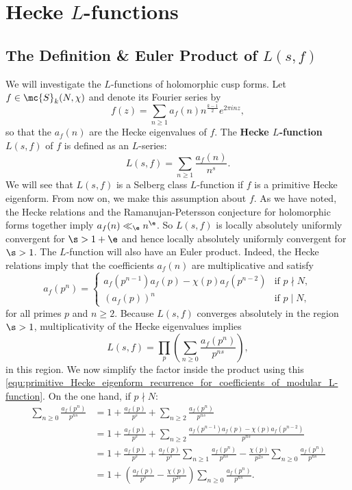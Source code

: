   \section{Hecke \texorpdfstring{$L$}{L}-functions}
    \subsection*{The Definition \& Euler Product of \texorpdfstring{$L(s,f)$}{L(s,f)}}
      We will investigate the $L$-functions of holomorphic cusp forms. Let $f \in \mc{S}_{k}(N,\chi)$ and denote its Fourier series by
      \[
        f(z) = \sum_{n \ge 1}a_{f}(n)n^{\frac{k-1}{2}}e^{2\pi inz},
      \]
      so that the $a_{f}(n)$ are the Hecke eigenvalues of $f$. The \textbf{Hecke $L$-function} $L(s,f)$ of $f$ is defined as an $L$-series:
      \[
        L(s,f) = \sum_{n \ge 1}\frac{a_{f}(n)}{n^{s}}.
      \]
      We will see that $L(s,f)$ is a Selberg class $L$-function if $f$ is a primitive Hecke eigenform. From now on, we make this assumption about $f$. As we have noted, the Hecke relations and the Ramanujan-Petersson conjecture for holomorphic forms together imply $a_{f}(n) \ll_{\e} n^{\e}$. So $L(s,f)$ is locally absolutely uniformly convergent for $\s > 1+\e$ and hence locally absolutely uniformly convergent for $\s > 1$. The $L$-function will also have an Euler product. Indeed, the Hecke relations imply that the coefficients $a_{f}(n)$ are multiplicative and satisfy
      \begin{equation}\label{equ:primitive_Hecke_eigenform_recurrence_for_coefficients_of_modular_L-function}
        a_{f}(p^{n}) = \begin{cases} a_{f}(p^{n-1})a_{f}(p)-\chi(p)a_{f}(p^{n-2}) & \text{if $p \nmid N$}, \\ (a_{f}(p))^{n} & \text{if $p \mid N$}, \end{cases}
      \end{equation}
      for all primes $p$ and $n \ge 2$. Because $L(s,f)$ converges absolutely in the region $\s > 1$, multiplicativity of the Hecke eigenvalues implies
      \[
        L(s,f) = \prod_{p}\left(\sum_{n \ge 0}\frac{a_{f}(p^{n})}{p^{ns}}\right),
      \]
      in this region. We now simplify the factor inside the product using this \cref{equ:primitive_Hecke_eigenform_recurrence_for_coefficients_of_modular_L-function}. On the one hand, if $p \nmid N$:
      \begin{align*}
        \sum_{n \ge 0}\frac{a_{f}(p^{n})}{p^{ns}} &= 1+\frac{a_{f}(p)}{p^{s}}+\sum_{n \ge 2}\frac{a_{f}(p^{n})}{p^{ns}} \\
        &= 1+\frac{a_{f}(p)}{p^{s}}+\sum_{n \ge 2}\frac{a_{f}(p^{n-1})a_{f}(p)-\chi(p)a_{f}(p^{n-2})}{p^{ns}} \\
        &= 1+\frac{a_{f}(p)}{p^{s}}+\frac{a_{f}(p)}{p^{s}}\sum_{n \ge 1}\frac{a_{f}(p^{n})}{p^{ns}}-\frac{\chi(p)}{p^{2s}}\sum_{n \ge 0}\frac{a_{f}(p^{n})}{p^{ns}} \\
        &= 1+\left(\frac{a_{f}(p)}{p^{s}}-\frac{\chi(p)}{p^{2s}}\right)\sum_{n \ge 0}\frac{a_{f}(p^{n})}{p^{ns}}.
      \end{align*}
